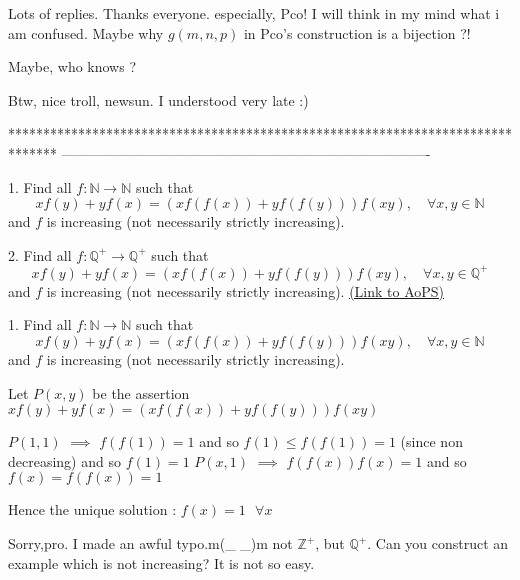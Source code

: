 \begin{solution}
	\begin{tcolorbox}Lots of replies. Thanks everyone. especially, Pco! I will think in my mind what i am confused. Maybe why $g(m,n,p)$ in Pco's construction is a bijection ?!\end{tcolorbox}
Maybe, who knows ?

Btw, nice troll, newsun. I understood very late :)
\end{solution}
*******************************************************************************
-------------------------------------------------------------------------------

\begin{problem}
	1. Find all $f:\mathbb N \to \mathbb N$ such that
\[xf(y)+yf(x)=(xf(f(x))+yf(f(y)))f(xy), \quad \forall x,y \in \mathbb N\]
and $f$ is increasing (not necessarily strictly increasing).

2. Find all $f:\mathbb Q^+ \to \mathbb Q^+$ such that
\[xf(y)+yf(x)=(xf(f(x))+yf(f(y)))f(xy), \quad \forall x,y \in \mathbb Q^+\]
and $f$ is increasing (not necessarily strictly increasing).
	\flushright \href{https://artofproblemsolving.com/community/c6h439130}{(Link to AoPS)}
\end{problem}



\begin{solution}
	\begin{tcolorbox}1. Find all $f:\mathbb N \to \mathbb N$ such that
\[xf(y)+yf(x)=(xf(f(x))+yf(f(y)))f(xy), \quad \forall x,y \in \mathbb N\]
and $f$ is increasing (not necessarily strictly increasing).\end{tcolorbox}


Let $P(x,y)$ be the assertion $xf(y)+yf(x)=(xf(f(x))+yf(f(y)))f(xy)$

$P(1,1)$ $\implies$ $f(f(1))=1$ and so $f(1)\le f(f(1))=1$ (since non decreasing) and so $f(1)=1$
$P(x,1)$ $\implies$ $f(f(x))f(x)=1$ and so $f(x)=f(f(x))=1$

Hence the  unique solution : $\boxed{f(x)=1\text{    }\forall x}$
\end{solution}



\begin{solution}
	Sorry,pro. I made an awful typo.m(_ _)m
not $\mathbb{Z}^+$, but $\mathbb{Q}^+$.
Can you construct an example which is not increasing? It is not so easy.
\end{solution}



